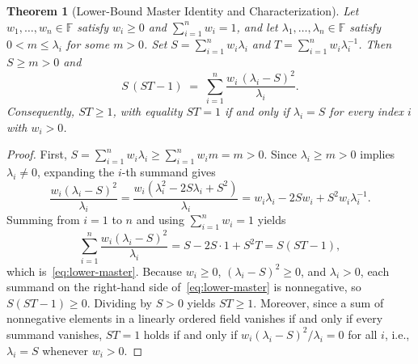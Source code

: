 \documentclass[11pt,a4paper]{article}
\newtheorem{theorem}{Theorem}[section]
\theoremstyle{definition}
\begin{document}
\begin{theorem}[Lower-Bound Master Identity and Characterization]
\label{thm:lower}
Let $w_1, \dots, w_n \in \mathbb{F}$ satisfy $w_i \ge 0$ and $\sum_{i=1}^n w_i = 1$,
and let $\lambda_1, \dots, \lambda_n \in \mathbb{F}$ satisfy $0 < m \le \lambda_i$
for some $m > 0$. Set $S = \sum_{i=1}^n w_i \lambda_i$ and
$T = \sum_{i=1}^n w_i \lambda_i^{-1}$. Then $S \ge m > 0$ and
\begin{equation}
  \label{eq:lower-master}
  S\,(S T - 1) \;=\; \sum_{i=1}^n \frac{w_i\,(\lambda_i - S)^2}{\lambda_i}.
\end{equation}
Consequently, $S T \ge 1$, with equality $S T = 1$ if and only if $\lambda_i = S$
for every index $i$ with $w_i > 0$.
\end{theorem}
\begin{proof}
First, $S = \sum_{i=1}^n w_i \lambda_i \ge \sum_{i=1}^n w_i m = m > 0$. Since
$\lambda_i \ge m > 0$ implies $\lambda_i \ne 0$, expanding the $i$-th summand gives
\[
  \frac{w_i(\lambda_i - S)^2}{\lambda_i}
  = \frac{w_i(\lambda_i^2 - 2S\lambda_i + S^2)}{\lambda_i}
  = w_i\lambda_i - 2S w_i + S^2 w_i \lambda_i^{-1}.
\]
Summing from $i = 1$ to $n$ and using $\sum_{i=1}^n w_i = 1$ yields
\[
  \sum_{i=1}^n \frac{w_i(\lambda_i - S)^2}{\lambda_i}
  = S - 2S \cdot 1 + S^2 T
  = S(S T - 1),
\]
which is~\eqref{eq:lower-master}. Because $w_i \ge 0$, $(\lambda_i - S)^2 \ge 0$,
and $\lambda_i > 0$, each summand on the right-hand side of~\eqref{eq:lower-master}
is nonnegative, so $S(S T - 1) \ge 0$. Dividing by $S > 0$ yields $S T \ge 1$.
Moreover, since a sum of nonnegative elements in a linearly ordered field vanishes
if and only if every summand vanishes, $S T = 1$ holds if and only if
$w_i(\lambda_i - S)^2/\lambda_i = 0$ for all $i$, i.e., $\lambda_i = S$ whenever
$w_i > 0$.
\end{proof}
\end{document}
